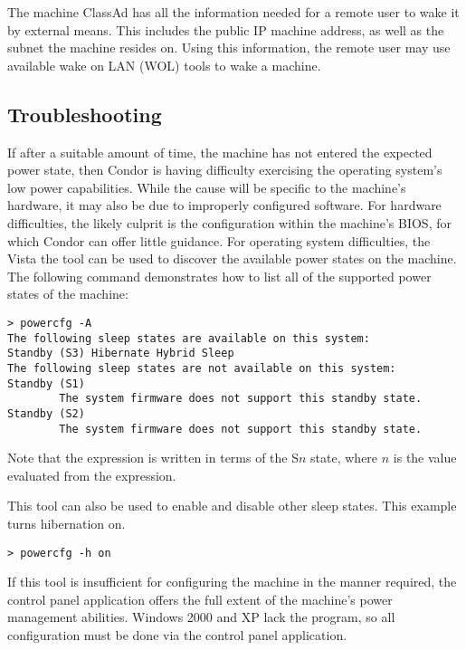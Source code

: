 The machine ClassAd has all the information needed for a remote
user to wake it by external means.
This includes the public IP machine address,
as well as the subnet the machine resides on.
Using this information,
the remote user may use available wake on LAN (WOL) tools 
to wake a machine.

\subsection{Troubleshooting}

If after a suitable amount of time,
the machine has not entered the expected power state,
then Condor is having difficulty exercising the operating system's
low power capabilities.  
While the cause will be specific to the machine's hardware,
it may also be due to improperly configured software.  
For hardware difficulties,
the likely culprit is the configuration within the machine's BIOS,
for which Condor can offer little guidance.
For operating system difficulties,
the Vista the  tool can be used to discover the available 
power states on the machine.
The following command demonstrates how to
list all of the supported power states of the machine:

\begin{verbatim}
> powercfg -A
The following sleep states are available on this system: 
Standby (S3) Hibernate Hybrid Sleep
The following sleep states are not available on this system:
Standby (S1)
        The system firmware does not support this standby state.
Standby (S2)
        The system firmware does not support this standby state.
\end{verbatim}

Note that the  expression is written in terms of the 
S$n$ state, where $n$ is the value evaluated from the expression.

This tool can also be used to enable and disable other sleep states.
This example turns hibernation on.

\begin{verbatim}
> powercfg -h on
\end{verbatim}

If this tool is insufficient for configuring the machine in the manner required,
the  control panel application offers
the full extent of the machine's power management abilities.
Windows 2000 and XP lack the  program,
so all configuration must be done via the 
control panel application.

